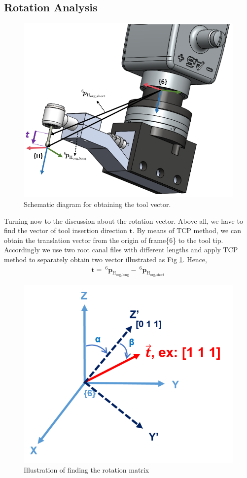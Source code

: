 \subsection{Rotation Analysis}
\label{sec:rot inf}
\begin{figure}[htbp]
\begin{center}
\includegraphics[width=0.7\linewidth]{Images/TCP2.png}
\caption{ 
Schematic diagram for obtaining the tool vector. 
}\label{fig:tcp2}
\end{center}
\end{figure}
Turning now to the discussion about the rotation vector. Above all, we have to find the vector of tool insertion direction $\boldsymbol{t}$. By means of TCP method, we can obtain the translation vector from the origin of frame\{6\} to the tool tip. Accordingly we use two root canal files with different lengths and apply TCP method to separately obtain two vector illustrated as Fig \ref{fig:tcp2}. Hence, 
\begin{equation}
\begin{split}
\boldsymbol{t} =\ ^\mathrm{6}\!\boldsymbol{p}_\mathrm{H_{org,long}} -\ ^\mathrm{6}\!\boldsymbol{p}_\mathrm{H_{org,short}}
\end{split}
\end{equation}
\begin{figure}[H]
\begin{center}
\includegraphics[width=0.6\linewidth]{Images/rot_inf.png}
\caption{
Illustration of finding the rotation matrix
}\label{fig:rot_inf}
\end{center}
\end{figure} 
